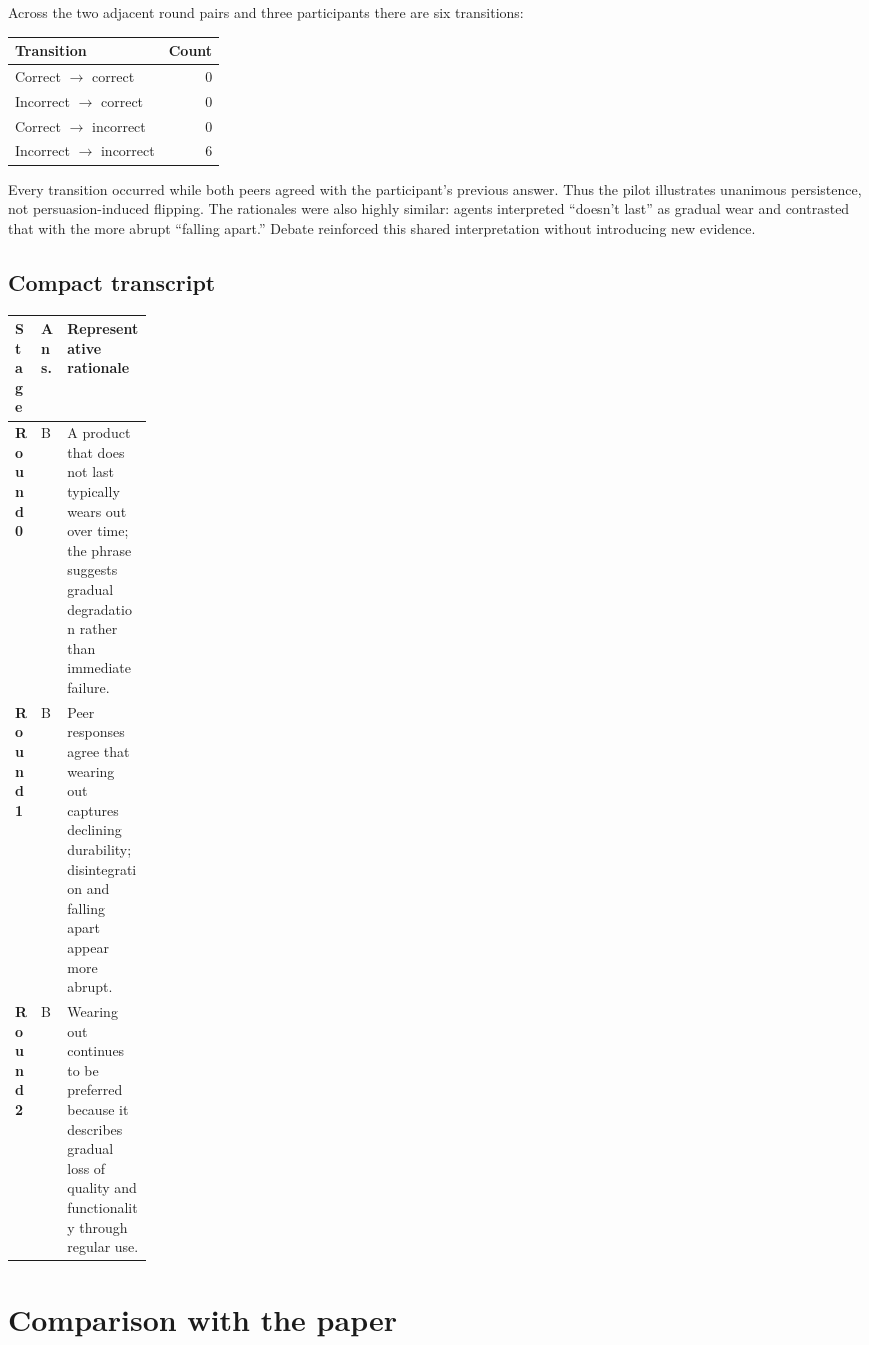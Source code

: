 \documentclass[10pt]{article}
\begin{document}
Across the two adjacent round pairs and three participants there are six transitions:

\begin{center}
\begin{tabular}{lr}
\toprule
Transition & Count \\
\midrule
Correct $\rightarrow$ correct & 0 \\
Incorrect $\rightarrow$ correct & 0 \\
Correct $\rightarrow$ incorrect & 0 \\
Incorrect $\rightarrow$ incorrect & 6 \\
\bottomrule
\end{tabular}
\end{center}

Every transition occurred while both peers agreed with the participant's previous answer. Thus the
pilot illustrates unanimous persistence, not persuasion-induced flipping. The rationales were also
highly similar: agents interpreted ``doesn't last'' as gradual wear and contrasted that with the more
abrupt ``falling apart.'' Debate reinforced this shared interpretation without introducing new evidence.

\subsection*{Compact transcript}

\small
\begin{tabularx}{\linewidth}{>{\bfseries}p{0.10\linewidth}p{0.06\linewidth}X}
\toprule
Stage & Ans. & Representative rationale \\
\midrule
Round 0 & B & A product that does not last typically wears out over time; the phrase suggests gradual degradation rather than immediate failure. \\
Round 1 & B & Peer responses agree that wearing out captures declining durability; disintegration and falling apart appear more abrupt. \\
Round 2 & B & Wearing out continues to be preferred because it describes gradual loss of quality and functionality through regular use. \\
\bottomrule
\end{tabularx}
\normalsize

\section{Comparison with the paper}
\end{document}
